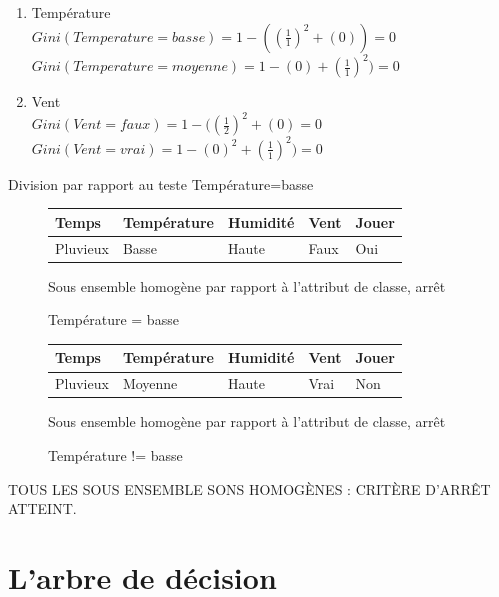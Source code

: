 \documentclass[a4paper, 11pt]{report}
\begin{document}
\begin{enumerate}
\begin{enumerate}
\item Température\\
$Gini(Temperature = basse) = 1 - ((\frac{1}{1})^2 + ( 0 ))=0 $\\
$Gini(Temperature = moyenne) = 1 - ( 0 ) + (\frac{1}{1})^2)=0 $\\

\item Vent\\
$Gini(Vent = faux) = 1 - ((\frac{1}{2})^2 + ( 0 )=0 $\\
$Gini(Vent = vrai) = 1 - ( 0 )^2 + (\frac{1}{1})^2)=0 $
\end{enumerate}
Division par rapport au teste Température=basse

\begin{figure}[!h]
\caption{Température = basse}
\label{ens12}
\begin{center}
\begin{tabular}{| l | l | l | l | l |}
\hline
\rowcolor{gray!25}
Temps & Température & Humidité & Vent & Jouer \\
\hline
Pluvieux & Basse & Haute & Faux & \cellcolor{yellow}Oui \\
\hline
\end{tabular}
\end{center}
Sous ensemble homogène par rapport à l'attribut de classe, arrêt
\end{figure}
\begin{figure}[!h]
\caption{Température != basse}
\label{ens12}
\begin{center}
\begin{tabular}{| l | l | l | l | l |}
\hline
\rowcolor{gray!25}
Temps & Température & Humidité & Vent & Jouer \\
\hline
Pluvieux & Moyenne & Haute & Vrai &  \cellcolor{green}Non \\
\hline
\end{tabular}
\end{center}
Sous ensemble homogène par rapport à l'attribut de classe, arrêt
\end{figure}



\end{enumerate}

TOUS LES SOUS ENSEMBLE SONS HOMOGÈNES : CRITÈRE D'ARRÊT ATTEINT.

\newpage
\section{L'arbre de décision}
\end{document}
